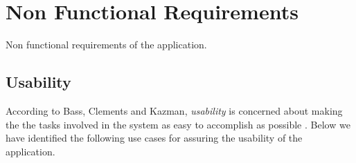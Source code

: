 \section{Non Functional Requirements}
\label{cha:nonfuncreq}
Non functional requirements of the application.

\subsection{Usability}
According to Bass, Clements and Kazman, \emph{usability} is concerned about making the the tasks involved in the system as easy to accomplish as possible \citep[p.~90]{ProgarkPensum}. Below we have identified the following use cases for assuring the usability of the application.

